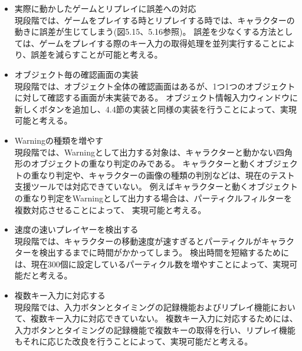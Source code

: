 \begin{itemize}
	\item 実際に動かしたゲームとリプレイに誤差への対応\\		
		現段階では、ゲームをプレイする時とリプレイする時では、キャラクターの動きに誤差が生じてしまう(図5.15、5.16参照)。
		誤差を少なくする方法としては、ゲームをプレイする際のキー入力の取得処理を並列実行することにより、誤差を減らすことが可能と考える。
		
	\item オブジェクト毎の確認画面の実装\\
		現段階では、オブジェクト全体の確認画面はあるが、1つ1つのオブジェクトに対して確認する画面が未実装である。
		オブジェクト情報入力ウィンドウに新しくボタンを追加し、4.4節の実装と同様の実装を行うことによって、実現可能と考える。
	
	\item Warningの種類を増やす\\
		現段階では、Warningとして出力する対象は、キャラクターと動かない四角形のオブジェクトの重なり判定のみである。
		キャラクターと動くオブジェクトの重なり判定や、キャラクターの画像の種類の判別などは、現在のテスト支援ツールでは対応できていない。
		例えばキャラクターと動くオブジェクトの重なり判定をWarningとして出力する場合は、パーティクルフィルターを複数対応させることによって、
		実現可能と考える。
		
	\item 速度の速いプレイヤーを検出する\\
		現段階では、キャラクターの移動速度が速すぎるとパーティクルがキャラクターを検出するまでに時間がかかってしまう。
		検出時間を短縮するためには、現在300個に設定しているパーティクル数を増やすことによって、実現可能だと考える。
			
	\item 複数キー入力に対応する\\
		現段階では、入力ボタンとタイミングの記録機能およびリプレイ機能において、複数キー入力に対応できていない。
		複数キー入力に対応するためには、入力ボタンとタイミングの記録機能で複数キーの取得を行い、リプレイ機能もそれに応じた改良を行うことによって、実現可能だと考える。
		
\end{itemize}




